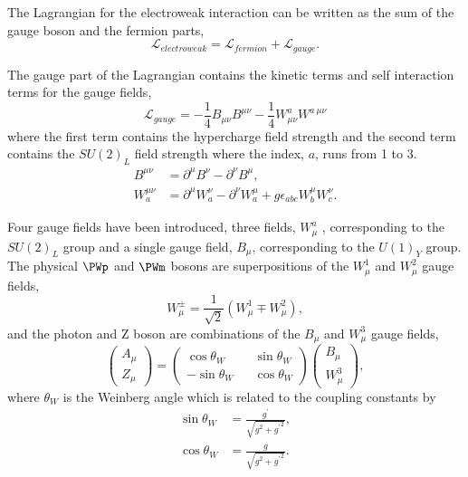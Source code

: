 The Lagrangian for the electroweak interaction can be written as the sum of the
gauge boson and the fermion parts,
\begin{equation}
\mathcal{L}_{electroweak} = 
\mathcal{L}_{fermion}
+ \mathcal{L}_{gauge}.
\end{equation}

The gauge part of the Lagrangian contains the kinetic terms and self interaction
terms for the gauge fields,
\begin{equation}
\mathcal{L}_{gauge} = 
- \frac{1}{4} B_{\mu\nu} B^{\mu\nu}
- \frac{1}{4} W^{a}_{\mu\nu} W^{a~\mu\nu}
\end{equation}
where the first term contains the hypercharge field strength and the second term 
contains the $SU(2)_L$ field strength where the index, $a$, runs from 1 to 3.
\begin{align*}
B^{\mu\nu}     &= \partial^{\mu} B^{\nu} - \partial^{\nu} B^{\mu},\\
W_{a}^{\mu\nu} &= \partial^{\mu} W_{a}^{\nu} - \partial^{\nu} W_{a}^{\mu} 
                + g \epsilon_{abc} W_{b}^{\mu} W_{c}^{\nu}.
\end{align*}

Four gauge fields have been introduced, 
three fields, ${W}^{a}_{\mu}$ , corresponding to the $SU(2)_{L}$
group and a single gauge field, $B_{\mu}$, corresponding to the $U(1)_{Y}$ group.
The physical $\PWp$ and $\PWm$ bosons are superpositions of the $W^{1}_{\mu}$
and $W^{2}_{\mu}$ gauge fields,
\begin{equation}
W^{\pm}_{\mu} = \frac{1}{\sqrt{2}} \left(W^{1}_{\mu} \mp W^{2}_{\mu}\right),
\label{eq:wgauge}
\end{equation}
and the photon and Z boson are combinations of the $B_{\mu}$ and $W^{3}_{\mu}$
gauge fields,
\begin{equation}
\left( \begin{matrix} A_{\mu}\\ Z_{\mu}\end{matrix}\right) =
\left( \begin{matrix} \cos\theta_{W} && \sin\theta_{W} \\  
                      -\sin\theta_{W} && \cos\theta_{W} \end{matrix}\right) 
\left( \begin{matrix} B_{\mu}\\ W^{3}_{\mu}\end{matrix}\right) ,
\label{eq:bgauge}
\end{equation}
where $\theta_{W}$ is the Weinberg angle which is related to the coupling
constants by
\begin{align*}
\sin\theta_{W} &= \frac{g^{\prime}}{\sqrt{g^{2}+{g^{\prime}}^{2}}},\\
\cos\theta_{W} &= \frac{g}{\sqrt{g^{2}+{g^{\prime}}^{2}}}.
\end{align*}

